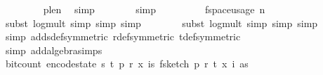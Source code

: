 \begin{isabellebody}
\ \ \ \ \ \ \ \isamarkupfalse%
\ p{\isacharunderscore}{\kern0pt}le{\isacharunderscore}{\kern0pt}n\ \isamarkupfalse%
\ simp\isanewline
\ \ \ \ \ \ \isamarkupfalse%
\ simp\isanewline
\ \ \ \ \isamarkupfalse%
\ \isamarkupfalse%
\ {\isachardoublequoteopen}{\isachardot}{\kern0pt}{\isachardot}{\kern0pt}{\isachardot}{\kern0pt}\ {\isasymle}\ f{}{\isacharunderscore}{\kern0pt}space{\isacharunderscore}{\kern0pt}usage\ {\isacharparenleft}{\kern0pt}n{\isacharcomma}{\kern0pt}\ {\isasymepsilon}{\isacharcomma}{\kern0pt}\ {\isasymdelta}{\isacharparenright}{\kern0pt}{\isachardoublequoteclose}\isanewline
\ \ \ \ \ \ \isamarkupfalse%
\ {\isacharparenleft}{\kern0pt}subst\ log{\isacharunderscore}{\kern0pt}mult{\isacharcomma}{\kern0pt}\ simp{\isacharcomma}{\kern0pt}\ simp{\isacharcomma}{\kern0pt}\ simp{\isacharparenright}{\kern0pt}\isanewline
\ \ \ \ \ \ \isamarkupfalse%
\ {\isacharparenleft}{\kern0pt}subst\ log{\isacharunderscore}{\kern0pt}mult{\isacharcomma}{\kern0pt}\ simp{\isacharcomma}{\kern0pt}\ simp{\isacharcomma}{\kern0pt}\ simp{\isacharparenright}{\kern0pt}\isanewline
\ \ \ \ \ \ \isamarkupfalse%
\ {\isacharparenleft}{\kern0pt}simp\ add{\isacharcolon}{\kern0pt}s{\isacharunderscore}{\kern0pt}def{\isacharbrackleft}{\kern0pt}symmetric{\isacharbrackright}{\kern0pt}\ r{\isacharunderscore}{\kern0pt}def{\isacharbrackleft}{\kern0pt}symmetric{\isacharbrackright}{\kern0pt}\ t{\isacharunderscore}{\kern0pt}def{\isacharbrackleft}{\kern0pt}symmetric{\isacharbrackright}{\kern0pt}{\isacharparenright}{\kern0pt}\isanewline
\ \ \ \ \ \ \isamarkupfalse%
\ {\isacharparenleft}{\kern0pt}simp\ add{\isacharcolon}{\kern0pt}algebra{\isacharunderscore}{\kern0pt}simps{\isacharparenright}{\kern0pt}\isanewline
\ \ \ \ \isamarkupfalse%
\ \isamarkupfalse%
\ {\isachardoublequoteopen}bit{\isacharunderscore}{\kern0pt}count\ {\isacharparenleft}{\kern0pt}encode{\isacharunderscore}{\kern0pt}state\ {\isacharparenleft}{\kern0pt}s{\isacharcomma}{\kern0pt}\ t{\isacharcomma}{\kern0pt}\ p{\isacharcomma}{\kern0pt}\ r{\isacharcomma}{\kern0pt}\ x{\isacharcomma}{\kern0pt}\ {\isasymlambda}i{\isasymin}{\isacharbraceleft}{\kern0pt}{}{\isachardot}{\kern0pt}{\isachardot}{\kern0pt}{\isacharless}{\kern0pt}s{\isacharbraceright}{\kern0pt}{\isachardot}{\kern0pt}\ f{}{\isacharunderscore}{\kern0pt}sketch\ p\ r\ t\ {\isacharparenleft}{\kern0pt}x\ i{\isacharparenright}{\kern0pt}\ as{\isacharparenright}{\kern0pt}{\isacharparenright}{\kern0pt}\ {\isasymle}\ \isanewline

\end{isabellebody}
